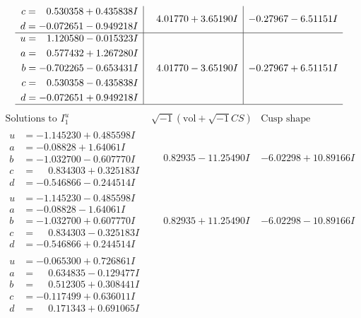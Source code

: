 \documentclass[1p]{elsarticle_modified}
\theoremstyle{definition}
\newcommand{\I}{\sqrt{-1}}
\begin{document}
$$\begin{array}{c|c|c}
\begin{aligned}
c &= \phantom{-}0.530358 + 0.435838 I \\
d &= -0.072651 - 0.949218 I\end{aligned}
 & \phantom{-}4.01770 + 3.65190 I & -0.27967 - 6.51151 I \\ \hline\begin{aligned}
u &= \phantom{-}1.120580 - 0.015323 I \\
a &= \phantom{-}0.577432 + 1.267280 I \\
b &= -0.702265 - 0.653431 I \\
c &= \phantom{-}0.530358 - 0.435838 I \\
d &= -0.072651 + 0.949218 I\end{aligned}
 & \phantom{-}4.01770 - 3.65190 I & -0.27967 + 6.51151 I\\
 \hline 
 \end{array}$$\newpage$$\begin{array}{c|c|c}  
\text{Solutions to }I^u_{1}& \I (\text{vol} + \sqrt{-1}CS) & \text{Cusp shape}\\
 \hline 
\begin{aligned}
u &= -1.145230 + 0.485598 I \\
a &= -0.08828 + 1.64061 I \\
b &= -1.032700 - 0.607770 I \\
c &= \phantom{-}0.834303 + 0.325183 I \\
d &= -0.546866 - 0.244514 I\end{aligned}
 & \phantom{-}0.82935 - 11.25490 I & -6.02298 + 10.89166 I \\ \hline\begin{aligned}
u &= -1.145230 - 0.485598 I \\
a &= -0.08828 - 1.64061 I \\
b &= -1.032700 + 0.607770 I \\
c &= \phantom{-}0.834303 - 0.325183 I \\
d &= -0.546866 + 0.244514 I\end{aligned}
 & \phantom{-}0.82935 + 11.25490 I & -6.02298 - 10.89166 I \\ \hline\begin{aligned}
u &= -0.065300 + 0.726861 I \\
a &= \phantom{-}0.634835 - 0.129477 I \\
b &= \phantom{-}0.512305 + 0.308441 I \\
c &= -0.117499 + 0.636011 I \\
d &= \phantom{-}0.171343 + 0.691065 I\end{aligned}

\end{array}$$
\end{document}
